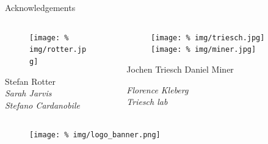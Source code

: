 \begin{frame}{{\huge Acknowledgements}}
  \large
  \vspace{0.95cm}
  \begin{columns}
    \begin{column}{.33\textwidth}
      \minipage[c][0.3\textheight][s]{\columnwidth}
      
      \begin{figure}
        \centering
        \texttt{[image: \%
          img/rotter.jpg]} %
      \end{figure}
      \begin{center}
        Stefan Rotter\\[0.72cm]
        
        \itshape
        Sarah Jarvis\\
        Stefano Cardanobile
        
      \end{center}
      
      
      \endminipage      
    \end{column}
    \begin{column}{.49\textwidth}
      \minipage[c][0.3\textheight][s]{\columnwidth}
            \begin{figure}
        \centering
        \texttt{[image: \%
          img/triesch.jpg]} %
       \hfill
        \texttt{[image: \%
          img/miner.jpg]} %
      \end{figure}
      Jochen Triesch \hfill Daniel Miner \\[0.2cm]

      \begin{center}
        \itshape
        Florence Kleberg\\
        Triesch lab
      \end{center}

     
      \endminipage           
    \end{column}
  \end{columns}


  \vspace{2.7cm}

  \begin{figure}
    \centering
    \texttt{[image: \%
      img/logo\_banner.png]} %
  \end{figure}

  
\end{frame}
